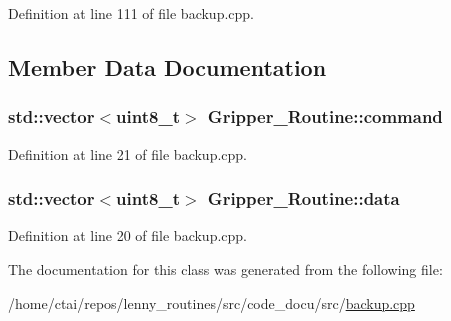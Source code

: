 Definition at line 111 of file backup.\+cpp.



\subsection{Member Data Documentation}
\subsubsection[{\texorpdfstring{command}{command}}]{\setlength{\rightskip}{0pt plus 5cm}std\+::vector$<$uint8\+\_\+t$>$ Gripper\+\_\+\+Routine\+::command}\hypertarget{class_gripper___routine_adaa3b6a5d6c4201b3c7b997c34ca4d81}{}\label{class_gripper___routine_adaa3b6a5d6c4201b3c7b997c34ca4d81}


Definition at line 21 of file backup.\+cpp.

\subsubsection[{\texorpdfstring{data}{data}}]{\setlength{\rightskip}{0pt plus 5cm}std\+::vector$<$uint8\+\_\+t$>$ Gripper\+\_\+\+Routine\+::data}\hypertarget{class_gripper___routine_afb80e9508265d0b8f035bb5d4d5dc462}{}\label{class_gripper___routine_afb80e9508265d0b8f035bb5d4d5dc462}


Definition at line 20 of file backup.\+cpp.



The documentation for this class was generated from the following file\+:\begin{DoxyCompactItemize}
\item 
/home/ctai/repos/lenny\+\_\+routines/src/code\+\_\+docu/src/\hyperlink{backup_8cpp}{backup.\+cpp}\end{DoxyCompactItemize}
